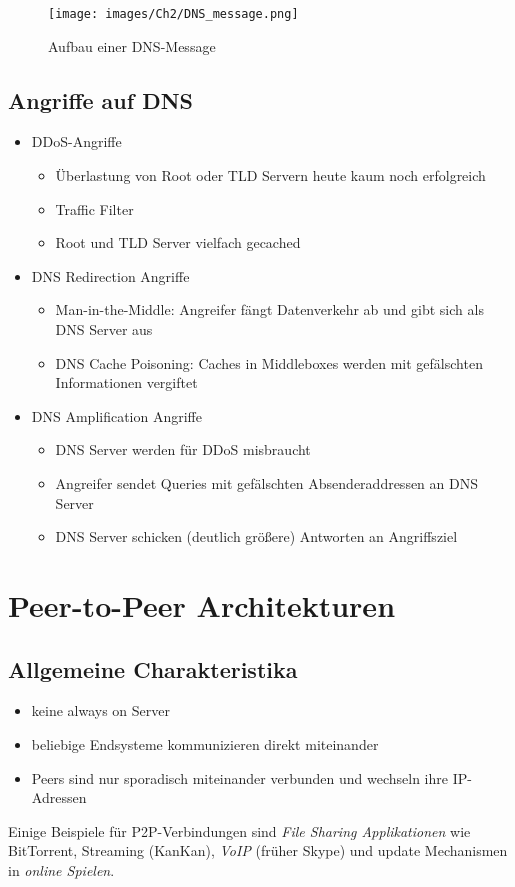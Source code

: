 \begin{figure}[H]
    \centering
    \texttt{[image: images/Ch2/DNS\_message.png]}
    \caption{Aufbau einer DNS-Message}
    \label{Ch02-DNS_messageFormat}
\end{figure}

\subsection{Angriffe auf DNS}
\begin{itemize}
    \item DDoS-Angriffe
        \begin{itemize}
            \item Überlastung von Root oder TLD Servern heute kaum noch erfolgreich
            \item Traffic Filter
            \item Root und TLD Server vielfach gecached
        \end{itemize}
    \item DNS Redirection Angriffe
        \begin{itemize}
            \item Man-in-the-Middle: Angreifer fängt Datenverkehr ab und gibt sich als DNS Server aus
            \item DNS Cache Poisoning: Caches in Middleboxes werden mit gefälschten Informationen vergiftet
        \end{itemize}
    \item DNS Amplification Angriffe
        \begin{itemize}
            \item DNS Server werden für DDoS misbraucht
            \item Angreifer sendet Queries mit gefälschten Absenderaddressen an DNS Server
            \item DNS Server schicken (deutlich größere) Antworten an Angriffsziel
        \end{itemize}
\end{itemize}

\section{Peer-to-Peer Architekturen}
\subsection{Allgemeine Charakteristika}
\begin{itemize}
    \item keine always on Server
    \item beliebige Endsysteme kommunizieren direkt miteinander
    \item Peers sind nur sporadisch miteinander verbunden und wechseln ihre IP-Adressen
\end{itemize}
Einige Beispiele für P2P-Verbindungen sind \emph{File Sharing Applikationen} wie BitTorrent, Streaming (KanKan), \emph{VoIP} (früher Skype) und update Mechanismen in \emph{online Spielen}.

